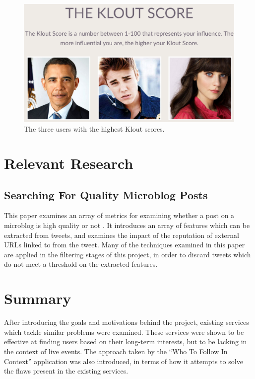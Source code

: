 \documentclass{l4proj}
\begin{document}
\begin{figure}[H]
\centering
\includegraphics[scale=0.3]{klout.png}
\caption{The three users with the highest Klout scores.}
\label{kloutimage}
\end{figure}

\section{Relevant Research}

    \subsection{Searching For Quality Microblog Posts}
    This paper examines an array of metrics for examining whether a post on a microblog is high quality or not \cite{Vosecky2012}. It introduces an array of features which can be extracted from tweets, and examines the impact of the reputation of external URLs linked to from the tweet. Many of the techniques examined in this paper are applied in the filtering stages of this project, in order to discard tweets which do not meet a threshold on the extracted features.
    
\section{Summary}
After introducing the goals and motivations behind the project, existing services which tackle similar problems were examined. These services were shown to be effective at finding users based on their long-term interests, but to be lacking in the context of live events. The approach taken by the ``Who To Follow In Context'' application was also introduced, in terms of how it attempts to solve the flaws present in the existing services.
\end{document}

